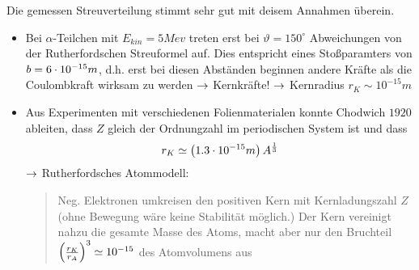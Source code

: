 Die gemessen Streuverteilung stimmt sehr gut mit deisem Annahmen überein.
\begin{bem}
    \begin{itemize}
        \item  Bei $\alpha$-Teilchen mit $E_{kin} = 5Mev$ treten erst bei $\vartheta =
        150^{\circ}$ Abweichungen von der Rutherfordschen Streuformel auf.
        Dies entspricht eines Stoßparamters von $b= 6 \cdot 10^{-15}m$, d.h. erst bei
        diesen Abständen beginnen andere Kräfte als die Coulombkraft wirksam zu
        werden $\rightarrow$ Kernkräfte! 
        $\rightarrow$ Kernradius $r_K \sim 10^{-15} m$
        \item Aus Experimenten mit verschiedenen Folienmaterialen konnte
        Chodwich $1920$ ableiten, dass $Z$ gleich der Ordnungzahl im
        periodischen System ist und dass
        \begin{equation*}
            r_K \simeq \left( 1.3 \cdot 10^{-15} m \right) A^{\frac{1}{3}}
        \end{equation*}
        $\rightarrow$ Rutherfordsches Atommodell:
        \begin{quote}
            Neg. Elektronen umkreisen den positiven Kern mit Kernladungszahl
            $Z$ (ohne Bewegung wäre keine Stabilität möglich.) Der Kern
            vereinigt nahzu die gesamte Masse des Atoms, macht aber nur den
            Bruchteil $\left( \frac{r_K}{r_A} \right)^3 \simeq 10^{-15}$ des
            Atomvolumens aus
        \end{quote}
    \end{itemize}
\end{bem}



